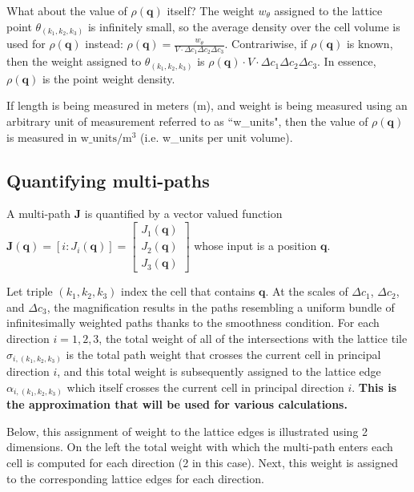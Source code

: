 \documentclass{book}
\begin{document}
What about the value of \(\rho(\mathbf{q})\) itself? The weight \(w_\theta\) assigned to the lattice point \(\theta_{(k_1,k_2,k_3)}\) is infinitely small, so the average density over the cell volume is used for \(\rho(\mathbf{q})\) instead: \(\rho(\mathbf{q}) = \frac{w_\theta}{V \cdot \Delta c_1 \Delta c_2 \Delta c_3}\). Contrariwise, if \(\rho(\mathbf{q})\) is known, then the weight assigned to \(\theta_{(k_1,k_2,k_3)}\) is \(\rho(\mathbf{q}) \cdot V \cdot \Delta c_1 \Delta c_2 \Delta c_3\). In essence, \(\rho(\mathbf{q})\) is the point weight density.

If length is being measured in meters (m), and weight is being measured using an arbitrary unit of measurement referred to as ``w\_units", then the value of \(\rho(\mathbf{q})\) is measured in \(\text{w\_units}/\text{m}^3\) (i.e. w\_units per unit volume).




\subsection*{Quantifying multi-paths}

A multi-path \(\mathbf{J}\) is quantified by a vector valued function \(\mathbf{J}(\mathbf{q}) = [i : J_i(\mathbf{q})] = \begin{bmatrix} J_1(\mathbf{q}) \\ J_2(\mathbf{q}) \\ J_3(\mathbf{q}) \end{bmatrix}\) whose input is a position \(\mathbf{q}\). 

Let triple \((k_1, k_2, k_3)\) index the cell that contains \(\mathbf{q}\). At the scales of \(\Delta c_1\), \(\Delta c_2\), and \(\Delta c_3\), the magnification results in the paths resembling a uniform bundle of infinitesimally weighted paths thanks to the smoothness condition. For each direction \(i = 1, 2, 3\), the total weight of all of the intersections with the lattice tile \(\sigma_{i, (k_1, k_2, k_3)}\) is the total path weight that crosses the current cell in principal direction \(i\), and this total weight is subsequently assigned to the lattice edge \(\alpha_{i, (k_1, k_2, k_3)}\) which itself crosses the current cell in principal direction \(i\). {\bf This is the approximation that will be used for various calculations.} 

Below, this assignment of weight to the lattice edges is illustrated using 2 dimensions. On the left the total weight with which the multi-path enters each cell is computed for each direction (2 in this case). Next, this weight is assigned to the corresponding lattice edges for each direction.
\end{document}
